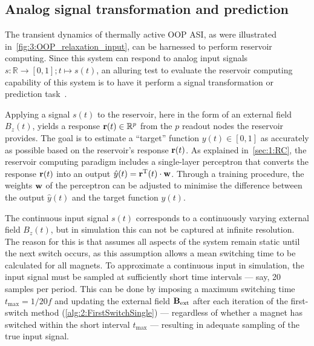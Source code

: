 \subsection{Analog signal transformation and prediction}
The transient dynamics of thermally active OOP ASI, as were illustrated in~\cref{fig:3:OOP_relaxation_input}, can be harnessed to perform reservoir computing.
Since this system can respond to analog input signals $s: \mathbb{R} \rightarrow [0, 1]; t \mapsto s(t)$, an alluring test to evaluate the reservoir computing capability of this system is to have it perform a signal transformation or prediction task~\cite{gartside2022reconfigurable,AdaptiveProgrammableRC,RC_NNN,TaskAdaptivePRC}. \par %
Applying a signal $s(t)$ to the reservoir, here in the form of an external field $B_z(t)$, yields a response $\boldsymbol{\mathbf{r}}(t) \in \mathbb{R}^p$ from the $p$ readout nodes the reservoir provides.
The goal is to estimate a ``target'' function $y(t) \in [0,1]$ as accurately as possible based on the reservoir's response $\boldsymbol{\mathbf{r}}(t)$.
As explained in~\cref{sec:1:RC}, the reservoir computing paradigm includes a single-layer perceptron that converts the response $\boldsymbol{\mathbf{r}}(t)$ into an output $\hat{y}(t) = \boldsymbol{\mathbf{r}}^\mathrm{T}(t) \cdot \boldsymbol{\mathbf{w}}$.
Through a training procedure, the weights $\boldsymbol{\mathbf{w}}$ of the perceptron can be adjusted to minimise the difference between the output $\hat{y}(t)$ and the target function $y(t)$. \par
The continuous input signal $s(t)$ corresponds to a continuously varying external field $B_z(t)$, but in simulation this can not be captured at infinite resolution.
The reason for this is that \hotspice assumes all aspects of the system remain static until the next switch occurs, as this assumption allows a mean switching time to be calculated for all magnets.
To approximate a continuous input in simulation, the input signal must be sampled at sufficiently short time intervals --- say, 20 samples per period.
This can be done by imposing a maximum switching time $t_\mathrm{max} = 1/20f$ and updating the external field $\boldsymbol{\mathbf{B}}_\mathrm{ext}$ after each iteration of the first-switch method (\cref{alg:2:FirstSwitchSingle}) --- regardless of whether a magnet has switched within the short interval $t_\mathrm{max}$ --- resulting in adequate sampling of the true input signal. \\\par

